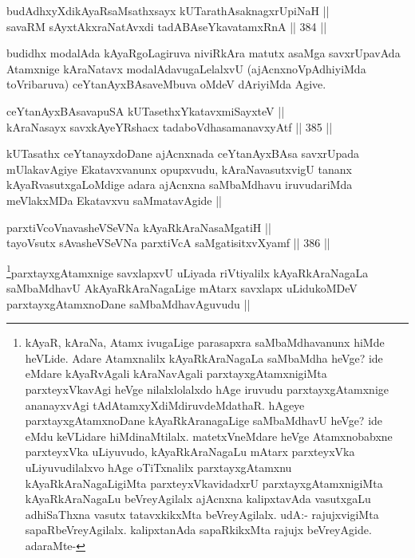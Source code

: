 \begin{shl}
budAdhxyXdikAyaRsaMsathxsayx kUTarathAsaknagxrUpiNaH || \\
savaRM sAyxtAkxraNatAvxdi tadABAseYkavatamxRnA ||  384 ||  
\end{shl}

\begin{artha}
budidhx modalAda kAyaRgoLagiruva niviRkAra matutx asaMga savxrUpavAda Atamxnige kAraNatavx modalAdavugaLelalxvU (ajAcnxnoVpAdhiyiMda toVribaruva) ceYtanAyxBAsaveMbuva oMdeV dAriyiMda Agive.
\end{artha}


\begin{shl}
ceYtanAyxBAsavapuSA kUTasethxYkatavxmiSayxteV || \\
kAraNasayx savxkAyeYRshacx tadaboVdhasamanavxyAtf ||  385 ||  
\end{shl}

\begin{artha}
kUTasathx ceYtanayxdoDane ajAcnxnada ceYtanAyxBAsa savxrUpada mUlakavAgiye Ekatavxvanunx opupxvudu, kAraNavasutxvigU tananx kAyaRvasutxgaLoMdige adara ajAcnxna saMbaMdhavu iruvudariMda meVlakxMDa Ekatavxvu saMmatavAgide ||
\end{artha}

\begin{shl}
parxtiVcoV\s navasheVSeVNa kAyaRkAraNasaMgatiH || \\
tayoVsutx sAvasheVSeVNa parxtiVcA saMgatisitxvXyamf ||  386 ||  
\end{shl}

\begin{artha}
\footnote{kAyaR, kAraNa, Atamx ivugaLige parasapxra saMbaMdhavanunx hiMde heVLide. Adare Atamxnalilx kAyaRkAraNagaLa saMbaMdha heVge? ide eMdare kAyaRvAgali kAraNavAgali parxtayxgAtamxnigiMta parxteyxVkavAgi heVge nilalxlolalxdo hAge iruvudu parxtayxgAtamxnige ananayxvAgi tAdAtamxyXdiMdiruvdeMdathaR. hAgeye parxtayxgAtamxnoDane kAyaRkAranagaLige saMbaMdhavU heVge? ide eMdu keVLidare hiMdinaMtilalx. matetxVneMdare heVge Atamxnobabxne parxteyxVka uLiyuvudo, kAyaRkAraNagaLu mAtarx parxteyxVka uLiyuvudilalxvo hAge oTiTxnalilx parxtayxgAtamxnu kAyaRkAraNagaLigiMta parxteyxVkavidadxrU parxtayxgAtamxnigiMta kAyaRkAraNagaLu beVreyAgilalx ajAcnxna kalipxtavAda vasutxgaLu adhiSaThxna vasutx tatavxkikxMta beVreyAgilalx. udA:- rajujxvigiMta sapaRbeVreyAgilalx. kalipxtanAda sapaRkikxMta rajujx beVreyAgide. adaraMte-}parxtayxgAtamxnige savxlapxvU uLiyada riVtiyalilx kAyaRkAraNagaLa saMbaMdhavU AkAyaRkAraNagaLige mAtarx savxlapx uLidukoMDeV parxtayxgAtamxnoDane saMbaMdhavAguvudu ||
\end{artha}

